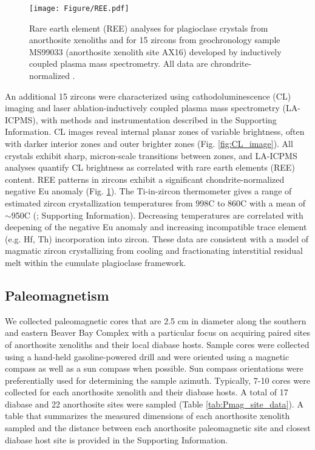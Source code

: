 \begin{figure}[h!]
\noindent\texttt{[image: Figure/REE.pdf]}
\centering
\caption{\footnotesize{Rare earth element (REE) analyses for plagioclase crystals from anorthosite xenoliths and for 15 zircons from geochronology sample MS99033 (anorthosite xenolith site AX16) developed by inductively coupled plasma mass spectrometry. All data are chrondrite-normalized \cite{Sun1989a}.}}
\label{fig:REE}
\end{figure}

An additional 15 zircons were characterized using cathodoluminescence (CL) imaging and laser ablation-inductively coupled plasma mass spectrometry (LA-ICPMS), with methods and instrumentation described in the Supporting Information. CL images reveal internal planar zones of variable brightness, often with darker interior zones and outer brighter zones (Fig. \ref{fig:CL_image}). All crystals exhibit sharp, micron-scale transitions between zones, and LA-ICPMS analyses quantify CL brightness as correlated with rare earth elements (REE) content. REE patterns in zircons exhibit a significant chondrite-normalized negative Eu anomaly (Fig. \ref{fig:REE}). The Ti-in-zircon thermometer gives a range of estimated zircon crystallization temperatures from 998\textdegree C to 860\textdegree C with a mean of $\sim$950\textdegree C (; Supporting Information). Decreasing temperatures are correlated with deepening of the negative Eu anomaly and increasing incompatible trace element (e.g. Hf, Th) incorporation into zircon. These data are consistent with a model of magmatic zircon crystallizing from cooling and fractionating interstitial residual melt within the cumulate plagioclase framework.

\subsection{Paleomagnetism}

We collected paleomagnetic cores that are 2.5 cm in diameter along the southern and eastern Beaver Bay Complex with a particular focus on acquiring paired sites of anorthosite xenoliths and their local diabase hosts. Sample cores were collected using a hand-held gasoline-powered drill and were oriented using a magnetic compass as well as a sun compass when possible. Sun compass orientations were preferentially used for determining the sample azimuth. Typically, 7-10 cores were collected for each anorthosite xenolith and their diabase hosts. A total of 17 diabase and 22 anorthosite sites were sampled (Table \ref{tab:Pmag_site_data}). A table that summarizes the measured dimensions of each anorthosite xenolith sampled and the distance between each anorthosite paleomagnetic site and closest diabase host site is provided in the Supporting Information.  

